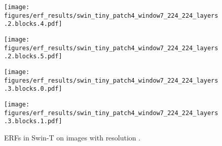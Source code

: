 \documentclass{article}
\begin{document}
\begin{figure}[tb]
  \begin{minipage}[t]{0.13\hsize}
    \centering
    \texttt{[image: figures/erf\_results/swin\_tiny\_patch4\_window7\_224\_224\_layers.2.blocks.4.pdf]}
    \label{figure:erf_swin:8}
  \end{minipage}
  \begin{minipage}[t]{0.13\hsize}
    \centering
    \texttt{[image: figures/erf\_results/swin\_tiny\_patch4\_window7\_224\_224\_layers.2.blocks.5.pdf]}
    \label{figure:erf_swin:9}
  \end{minipage}
  \begin{minipage}[t]{0.13\hsize}
    \centering
    \texttt{[image: figures/erf\_results/swin\_tiny\_patch4\_window7\_224\_224\_layers.3.blocks.0.pdf]}
    \label{figure:erf_swin:10}
  \end{minipage}
  \begin{minipage}[t]{0.13\hsize}
    \centering
    \texttt{[image: figures/erf\_results/swin\_tiny\_patch4\_window7\_224\_224\_layers.3.blocks.1.pdf]}
    \label{figure:erf_swin:11}
  \end{minipage}
  \caption{ERFs in Swin-T \cite{liu2021swin} on images with resolution .}
    \label{figure:erf_swin}
\end{figure} 
\end{document}
